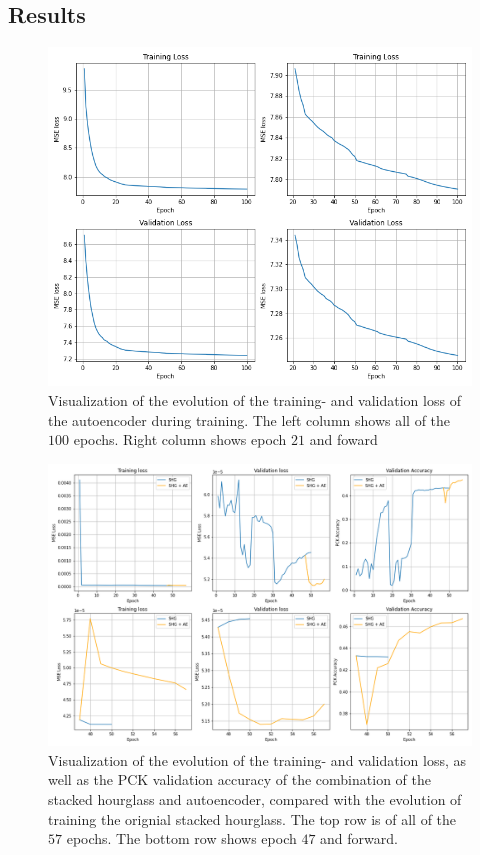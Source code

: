 \documentclass[./main.tex]{subfiles}
\begin{document}
\subsection{Results}
\begin{figure}[htbp]
    \centering
    \includegraphics[height = 10 cm]{entities/AE_evolution.png}
    \caption{Visualization of the evolution of the training- and validation loss of the autoencoder during training. The left column shows all of the $100$ epochs. Right column shows epoch $21$ and foward}
    \label{fig:AE_evolution}
\end{figure}
\begin{figure}[htbp]
    \centering
    \includegraphics[width = \textwidth]{entities//SHG_AE_Evolution.png}
    \caption{Visualization of the evolution of the training- and validation loss, as well as the PCK validation accuracy of the combination of the stacked hourglass and autoencoder, compared with the evolution of training the orignial stacked hourglass. The top row is of all of the $57$ epochs. The bottom row shows epoch $47$ and forward.}
    \label{fig:SHG_AE_evolution}
\end{figure}
\end{document}
